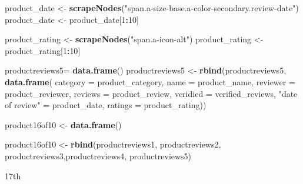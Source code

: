 \documentclass[
]{article}
\newenvironment{Shaded}{\begin{snugshade}}{\end{snugshade}}
\newcommand{\AttributeTok}[1]{\textcolor[rgb]{0.13,0.29,0.53}{#1}}
\newcommand{\DecValTok}[1]{\textcolor[rgb]{0.00,0.00,0.81}{#1}}
\newcommand{\FunctionTok}[1]{\textcolor[rgb]{0.13,0.29,0.53}{\textbf{#1}}}
\newcommand{\NormalTok}[1]{#1}
\newcommand{\OtherTok}[1]{\textcolor[rgb]{0.56,0.35,0.01}{#1}}
\newcommand{\SpecialCharTok}[1]{\textcolor[rgb]{0.81,0.36,0.00}{\textbf{#1}}}
\newcommand{\StringTok}[1]{\textcolor[rgb]{0.31,0.60,0.02}{#1}}
\begin{document}
\begin{Shaded}
\begin{Highlighting}[]
\NormalTok{  product\_date }\OtherTok{\textless{}{-}} \FunctionTok{scrapeNodes}\NormalTok{(}\StringTok{"span.a{-}size{-}base.a{-}color{-}secondary.review{-}date"}\NormalTok{)}
\NormalTok{  product\_date }\OtherTok{\textless{}{-}}\NormalTok{ product\_date[}\DecValTok{1}\SpecialCharTok{:}\DecValTok{10}\NormalTok{]}
  
\NormalTok{  product\_rating }\OtherTok{\textless{}{-}} \FunctionTok{scrapeNodes}\NormalTok{(}\StringTok{"span.a{-}icon{-}alt"}\NormalTok{)}
\NormalTok{  product\_rating }\OtherTok{\textless{}{-}}\NormalTok{ product\_rating[}\DecValTok{1}\SpecialCharTok{:}\DecValTok{10}\NormalTok{]}
  
\NormalTok{  productreviews5}\OtherTok{=} \FunctionTok{data.frame}\NormalTok{()}
\NormalTok{  productreviews5 }\OtherTok{\textless{}{-}} \FunctionTok{rbind}\NormalTok{(productreviews5, }\FunctionTok{data.frame}\NormalTok{(}
                      \AttributeTok{category =}\NormalTok{ product\_category,}
                      \AttributeTok{name =}\NormalTok{ product\_name,}
                      \AttributeTok{reviewer =}\NormalTok{ product\_reviewer,}
                      \AttributeTok{reviews =}\NormalTok{ product\_review,}
                      \AttributeTok{veridied =}\NormalTok{ verified\_reviews,}
                      \StringTok{"date of review"} \OtherTok{=}\NormalTok{ product\_date,}
                      \AttributeTok{ratings =}\NormalTok{ product\_rating))}
  
\NormalTok{  product16of10 }\OtherTok{\textless{}{-}} \FunctionTok{data.frame}\NormalTok{()}
  
\NormalTok{  product16of10 }\OtherTok{\textless{}{-}} \FunctionTok{rbind}\NormalTok{(productreviews1, productreviews2, productreviews3,productreviews4, productreviews5)}
\end{Highlighting}
\end{Shaded}

17th
\end{document}
